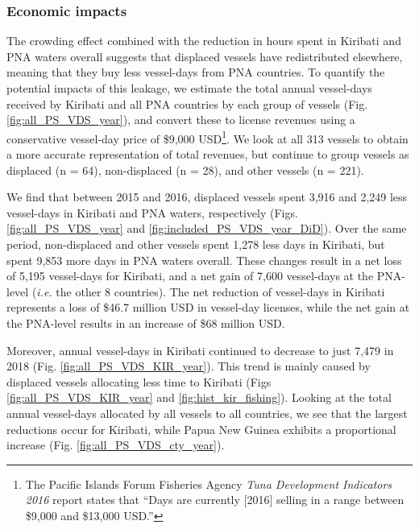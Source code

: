 \documentclass[9p,twocolumn,twoside,lineno]{pnas-new}
\begin{document}
\subsubsection{Economic impacts}

The crowding effect combined with the reduction in hours spent in Kiribati and PNA waters overall suggests that displaced vessels have redistributed elsewhere, meaning that they buy less vessel-days from PNA countries. To quantify the potential impacts of this leakage, we estimate the total annual vessel-days received by Kiribati and all PNA countries by each group of vessels (Fig. \ref{fig:all_PS_VDS_year}), and convert these to license revenues using a conservative vessel-day price of \$9,000 USD\footnote{The Pacific Islands Forum Fisheries Agency \emph{Tuna Development Indicators 2016} report states that ``Days are currently [2016] selling in a range between \$9,000 and \$13,000 USD.''}. We look at all 313 vessels to obtain a more accurate representation of total revenues, but continue to group vessels as displaced (n = 64), non-displaced (n = 28), and other vessels (n = 221).

We find that between 2015 and 2016, displaced vessels spent 3,916 and 2,249 less vessel-days in Kiribati and PNA waters, respectively (Figs. \ref{fig:all_PS_VDS_year} and \ref{fig:included_PS_VDS_year_DiD}). Over the same period, non-displaced and other vessels spent 1,278 less days in Kiribati, but spent 9,853 more days in PNA waters overall. These changes result in a net loss of 5,195 vessel-days for Kiribati, and a net gain of 7,600 vessel-days at the PNA-level (\emph{i.e.} the other 8 countries). The net reduction of vessel-days in Kiribati represents a loss of \$46.7 million USD in vessel-day licenses, while the net gain at the PNA-level results in an increase of \$68 million USD.

Moreover, annual vessel-days in Kiribati continued to decrease to just 7,479 in 2018 (Fig. \ref{fig:all_PS_VDS_KIR_year}). This trend is mainly caused by displaced vessels allocating less time to Kiribati (Figs \ref{fig:all_PS_VDS_KIR_year} and \ref{fig:hist_kir_fishing}). Looking at the total annual vessel-days allocated by all vessels to all countries, we see that the largest reductions occur for Kiribati, while Papua New Guinea exhibits a proportional increase (Fig. \ref{fig:all_PS_VDS_cty_year}).
\end{document}
